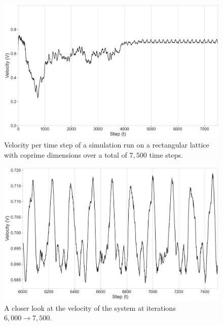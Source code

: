 \begin{figure}[H]
    \centering
    \includegraphics[width=\linewidth]{Images/Section 4/Experiment 3/Velocity.pdf}
    \caption{Velocity per time step of a simulation run on a rectangular lattice with coprime dimensions over a total of $7,500$ time steps.}
    \label{fig:Experiment-3.1}
\end{figure}

\vfill\null

\begin{figure}[H]
    \centering
    \includegraphics[width=\linewidth]{Images/Section 4/Experiment 3/Velocity_zoomed.pdf}
    \caption{A closer look at the velocity of the system at iterations $6,000 \rightarrow 7,500$.}
    \label{fig:Experiment-3.2}
\end{figure}

